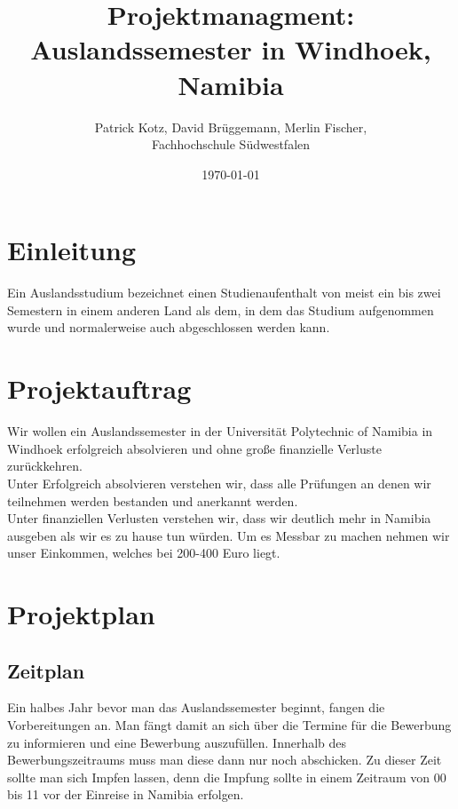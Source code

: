 \documentclass[11pt]{article}
\begin{document}
\begin{titlepage}
  \title{Projektmanagment: \\Auslandssemester in Windhoek, Namibia}
  \author{Patrick Kotz, David Brüggemann, Merlin Fischer,\\ Fachhochschule Südwestfalen}
  \date{\today}
\end{titlepage}

\fancyfoot[C]{\thepage}

\maketitle

\newpage
\tableofcontents
\newpage

\section{Einleitung}
Ein Auslandsstudium bezeichnet einen Studienaufenthalt von meist ein bis zwei Semestern in einem anderen Land als dem, in dem das Studium aufgenommen wurde und normalerweise auch abgeschlossen werden kann.

\section{Projektauftrag}
Wir wollen ein Auslandssemester in der Universität Polytechnic of Namibia in Windhoek erfolgreich absolvieren und ohne große finanzielle Verluste zurückkehren.\\

Unter Erfolgreich absolvieren verstehen wir, dass alle Prüfungen an denen wir teilnehmen werden bestanden und anerkannt werden.\\

Unter finanziellen Verlusten verstehen wir, dass wir deutlich mehr in Namibia ausgeben als wir es zu hause tun würden. Um es Messbar zu machen nehmen wir unser Einkommen, welches bei 200-400 Euro liegt.

\newpage

\section{Projektplan}

\subsection{Zeitplan}
Ein halbes Jahr bevor man das Auslandssemester beginnt, fangen die Vorbereitungen an. Man fängt damit an sich über die Termine für die Bewerbung zu informieren und eine Bewerbung auszufüllen. Innerhalb des Bewerbungszeitraums muss man diese dann nur noch abschicken. Zu dieser Zeit sollte man sich Impfen lassen, denn die Impfung sollte in einem Zeitraum von 00 bis 11 vor der Einreise in Namibia erfolgen. 
\end{document}

